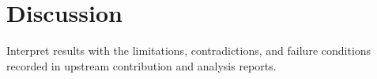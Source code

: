 \section{Discussion}

Interpret results with the limitations, contradictions, and failure conditions
recorded in upstream contribution and analysis reports.

